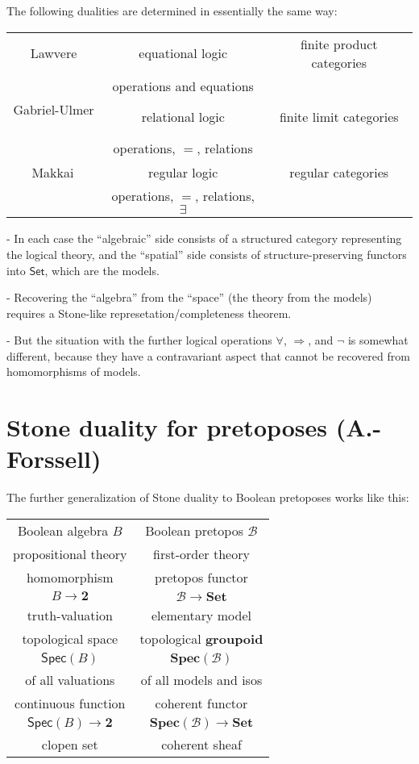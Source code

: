 \documentclass[11pt]{article}
\newcommand{\Set}{\ensuremath{\mathsf{Set}}}
\theoremstyle{remark}
\theoremstyle{definition}
\newcommand{\myemph}[1]{\textbf{#1}}
\begin{document}
The following dualities are determined in essentially the same way:

\begin{center}
\begin{tabular}{c|c|c}
Lawvere & equational logic & finite product categories \\
& operations and equations & \\
\hline
Gabriel-Ulmer$^{\strut}$ & relational logic & finite limit categories \\
& operations, $=$, relations &  \\
\hline
Makkai$^{\strut}$ & regular logic & regular categories \\
& operations, $=$, relations, $\exists$ & \\
\end{tabular}
\end{center}


- In each case the ``algebraic'' side consists of a structured category representing the logical theory, and the ``spatial'' side consists of structure-preserving functors into $\Set$, which are the models.
\smallskip

- Recovering the ``algebra'' from the ``space'' (the theory from the models) requires a Stone-like represetation/completeness theorem.
\smallskip

- But the situation with the further logical operations $\forall$, $\Rightarrow$, and $\neg$ is somewhat different, because they have a contravariant aspect that cannot be recovered from homomorphisms of models.

\section{Stone duality for pretoposes (A.-Forssell)}

The further generalization of Stone duality to Boolean pretoposes works like this:
\medskip

\begin{center}
\begin{tabular}{c|c}
Boolean algebra $B$ & Boolean pretopos $\mathcal{B}$ \\
propositional theory & first-order theory \\
\hline homomorphism & pretopos functor\\
$B\to \mathbf{2}$ &  $\mathcal{B}\to \mathbf{Set}$ \\
truth-valuation & elementary model \\
\hline topological space & topological \myemph{groupoid} \\
 $\mathsf{Spec}(B)$ & $\mathbf{Spec}(\mathcal{B})$ \\
of all valuations & of all models and isos \\
\hline continuous function & coherent functor \\
$\mathsf{Spec}(B) \to \mathbf{2}$  & $\mathbf{Spec}(\mathcal{B}) \to \mathbf{Set}$\\
clopen set & coherent sheaf 
\end{tabular}
\end{center}
\end{document}
